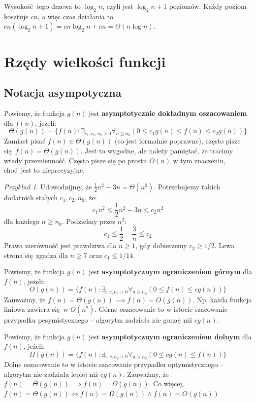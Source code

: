 \documentclass[10pt, oneside]{article}
\theoremstyle{remark}
\newtheorem*{example}{Przykład}
\begin{document}
Wysokość tego drzewa to $\log_2 n$, czyli jest $\log_2 n + 1 $ poziomów.
Każdy poziom kosztuje $cn$, a więc czas działania to $cn(\log_2 n + 1) = cn \log_2 n + cn = \Theta(n \log n)$.

\section{Rzędy wielkości funkcji}

\subsection{Notacja asympotyczna}

Powiemy, że funkcja $g(n)$ jest \textbf{asymptotycznie dokładnym oszacowaniem} dla $f(n)$, jeżeli:
$$
\Theta(g(n)) = \{ f(n): \exists_{c_1, c_2, n_0>0} \forall_{n \geq n_0} \left( 0 \leq c_1 g(n) \leq f(n) \leq c_2 g(n) \right) \}
$$
Zamiast pisać $f(n) \in \Theta(g(n))$ (co jest formalnie poprawne), często pisze się $f(n) = \Theta(g(n))$.
Jest to wygodne, ale należy pamiętać, że tracimy wtedy przemienność.
Często pisze się po prostu $O(n)$ w tym znaczeniu, choć jest to nieprecyzyjne.
\begin{example}
	Udowodnijmy, że $\frac{1}{2}n^2 - 3n = \Theta(n^2)$.
	Potrzebujemy takich dodatnich stałych $c_1, c_2, n_0$, że:
	$$
	c_1 n^2 \leq \frac{1}{2}n^2 - 3n \leq c_2 n^2
	$$
	dla każdego $n \geq n_0$.
	Podzielmy przez $n^2$:
	$$
	c_1 \leq \frac{1}{2} - \frac{3}{n} \leq c_2
	$$
	Prawa nierówność jest prawdziwa dla $n \geq 1$, gdy dobierzemy $c_2 \geq 1/2$.
	Lewa strona się zgadza dla $n \geq 7$ oraz $c_1 \leq 1/14$.
\end{example}

Powiemy, że funkcja $g(n)$ jest \textbf{asymptotycznym ograniczeniem górnym} dla $f(n)$, jeżeli:
$$
O(g(n)) = \{ f(n): \exists_{c, c, n_0>0} \forall_{n \geq n_0} \left(0 \leq f(n) \leq c g(n) \right) \}
$$
Zauważmy, że $f(n)=\Theta (g(n)) \implies f(n)=O(g(n))$.
Np. każda funkcja liniowa zawiera się w $O(n^2)$.
Górne oszacowanie to w istocie szacowanie przypadku pesymistycznego -- algorytm zadziała nie gorzej niż $cg(n)$.

Powiemy, że funkcja $g(n)$ jest \textbf{asymptotycznym ograniczeniem dolnym} dla $f(n)$, jeżeli:
$$
\Omega(g(n)) = \{ f(n): \exists_{c, c, n_0>0} \forall_{n \geq n_0} \left(0 \leq c g(n) \leq f(n) \right) \}
$$
Dolne oszacowanie to w istocie szacowanie przypadku optymistycznego -- algorytm nie zadziała lepiej niż $cg(n)$.
Zauważmy, że $f(n)=\Theta (g(n)) \implies f(n)=\Omega(g(n))$.
Co więcej, $f(n)=\Theta (g(n)) \iff f(n)=\Omega(g(n)) \land f(n)=O(g(n))$
\end{document}
